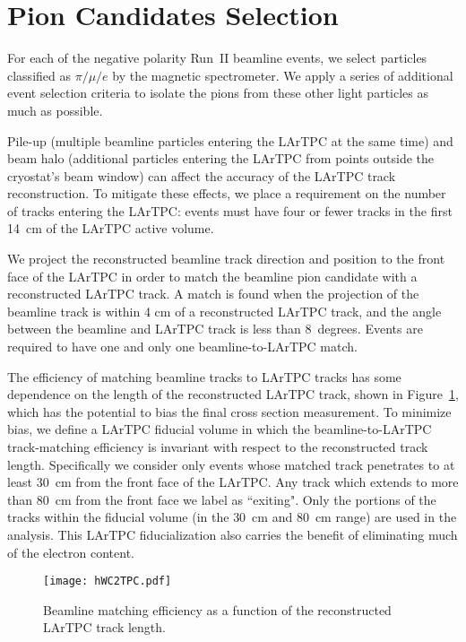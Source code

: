 \documentclass[%
 floatfix,
 reprint,
 twocolumn,
superscriptaddress,
showpacs,preprintnumbers,
 amsmath,amssymb,
 aps,
prd,
]{revtex4-1}
\begin{document}
\section{\label{sec:EventSelection}Pion Candidates Selection}

For each of the negative polarity Run~II beamline events, we select particles classified as $\pi/\mu/e$ by the magnetic spectrometer. We apply a series of additional event selection criteria to isolate the pions from these other light particles as much as possible.

Pile-up (multiple beamline particles entering the LArTPC at the same time) and beam halo (additional particles entering the LArTPC from points outside the cryostat's beam window) can affect the accuracy of the LArTPC track reconstruction. To mitigate these effects, we place a requirement on the number of tracks entering the LArTPC: events must have four or fewer tracks in the first 14~cm of the LArTPC active volume. 

We project the reconstructed beamline track direction and position to the front face of the LArTPC in order to match the beamline pion candidate with a reconstructed LArTPC track. A match is found when the projection of the beamline track is within 4 cm of a reconstructed LArTPC track, and the angle between the beamline and LArTPC track is less than 8~degrees.
Events are required to have one and only one beamline-to-LArTPC match.
 

The efficiency of matching beamline tracks to LArTPC tracks has some dependence on the length of the reconstructed LArTPC track, shown in Figure~\ref{fig:eff}, which has the potential to bias the final cross section measurement. To minimize bias, we define a LArTPC fiducial volume in which the beamline-to-LArTPC track-matching efficiency is invariant with respect to the reconstructed track length. Specifically we consider only events whose matched track penetrates to at least 30~cm from the front face of the LArTPC.  Any track which extends to more than 80~cm from the front face we label as ``exiting". Only the portions of the tracks  within the fiducial volume (in the 30~cm and 80~cm range) are used in the analysis. This LArTPC fiducialization also carries the benefit of eliminating much of the electron content.


\begin{figure}
\texttt{[image: hWC2TPC.pdf]}
\caption{\label{fig:eff} Beamline matching efficiency as a function of the reconstructed LArTPC track length. }
\end{figure}
\end{document}
